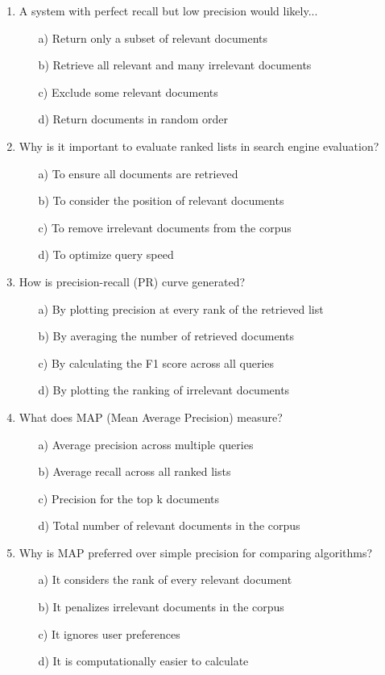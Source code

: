 \documentclass[8pt]{extarticle}
\begin{document}
\begin{multicols}{2}
\begin{enumerate}
\item A system with perfect recall but low precision would likely...
\begin{itemize}
\item[a)] Return only a subset of relevant documents
\item[b)] Retrieve all relevant and many irrelevant documents
\item[c)] Exclude some relevant documents
\item[d)] Return documents in random order
\end{itemize}

\item Why is it important to evaluate ranked lists in search engine evaluation?
\begin{itemize}
\item[a)] To ensure all documents are retrieved
\item[b)] To consider the position of relevant documents
\item[c)] To remove irrelevant documents from the corpus
\item[d)] To optimize query speed
\end{itemize}

\item How is precision-recall (PR) curve generated?
\begin{itemize}
\item[a)] By plotting precision at every rank of the retrieved list
\item[b)] By averaging the number of retrieved documents
\item[c)] By calculating the F1 score across all queries
\item[d)] By plotting the ranking of irrelevant documents
\end{itemize}

\item What does MAP (Mean Average Precision) measure?
\begin{itemize}
\item[a)] Average precision across multiple queries
\item[b)] Average recall across all ranked lists
\item[c)] Precision for the top k documents
\item[d)] Total number of relevant documents in the corpus
\end{itemize}

\item Why is MAP preferred over simple precision for comparing algorithms?
\begin{itemize}
\item[a)] It considers the rank of every relevant document
\item[b)] It penalizes irrelevant documents in the corpus
\item[c)] It ignores user preferences
\item[d)] It is computationally easier to calculate
\end{itemize}


\end{enumerate}
\end{multicols}
\end{document}
